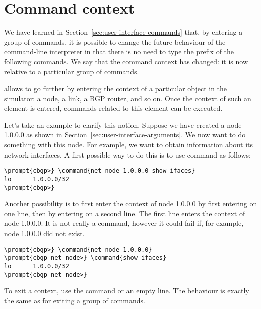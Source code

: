\section{Command context}
\label{sec:user-interface-context}

We have learned in Section~\ref{sec:user-interface-commands} that, by
entering a group of commands, it is possible to change the future
behaviour of the command-line interpreter in that there is no need to
type the prefix of the following commands. We say that the command
context has changed: it is now relative to a particular group of
commands.

 allows to go further by entering the context of a
particular object in the simulator: a node, a link, a BGP router, and
so on. Once the context of such an element is entered, commands
related to this element can be executed.

Let's take an example to clarify this notion. Suppose we have created
a node 1.0.0.0 as shown in
Section~\ref{sec:user-interface-arguments}. We now want to do
something with this node. For example, we want to obtain information
about its network interfaces. A first possible way to do this is to
use command  as follows:

\begin{Verbatim}[commandchars=\\\{\}]
\prompt{cbgp>} \command{net node 1.0.0.0 show ifaces}
lo      1.0.0.0/32
\prompt{cbgp>}
\end{Verbatim}

Another possibility is to first enter the context of node 1.0.0.0 by
first entering  on one line, then by
entering  on a second line. The first line enters
the context of node 1.0.0.0. It is not really a command, however it
could fail if, for example, node 1.0.0.0 did not exist.

\begin{Verbatim}[commandchars=\\\{\}]
\prompt{cbgp>} \command{net node 1.0.0.0}
\prompt{cbgp-net-node>} \command{show ifaces}
lo      1.0.0.0/32
\prompt{cbgp-net-node>}
\end{Verbatim}

To exit a context, use the  command or an empty
line. The behaviour is exactly the same as for exiting a group of
commands.


